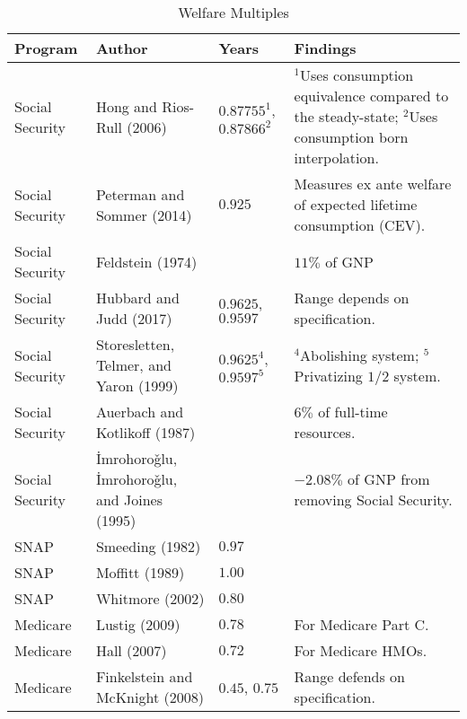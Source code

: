 \documentclass{article}
\begin{document}
\begin{sidewaystable}
\caption{Welfare Multiples}
\centering
\label{Measures of In-kind Program Welfare Effects}
\begin{tabularx}{\textwidth}{l X l X}
\toprule
Program		&		
Author		&		
Years		&
Findings	\\
\midrule
Social Security	&
Hong and Rios-Rull (2006)	&
$0.87755^1$, $0.87866^2$ &
$^1$Uses consumption equivalence compared to the steady-state;
$^2$Uses consumption born interpolation. \\

Social Security	&
Peterman and Sommer (2014)		&
$0.925$ &
Measures ex ante welfare of expected lifetime consumption (CEV). \\

Social Security	&
Feldstein (1974)		&
&
$11\%$ of GNP \\

Social Security	&
Hubbard and Judd (2017)		&
$0.9625$, $0.9597$ &
Range depends on specification. \\ 

Social Security	&
Storesletten, Telmer, and Yaron (1999)		&
$0.9625^4$, $0.9597^5$ &
$^4$Abolishing system; $^5$Privatizing $1/2$ system. \\

Social Security	&
Auerbach and Kotlikoff (1987)		&
&
$6\%$ of full-time resources. \\

Social Security	&
İmrohoroǧlu, İmrohoroǧlu, and Joines (1995)		&
&
$-2.08\%$ of GNP from removing Social Security. \\

SNAP				&
Smeeding (1982)		&
$0.97$ 				&
\\

SNAP				&
Moffitt (1989)		&
$1.00$ 				&
\\

SNAP				&
Whitmore (2002)		&
$0.80$ 				&
\\

Medicare			&
Lustig (2009)		&
$0.78$ 				&
For Medicare Part C. \\

Medicare			&
Hall (2007)		&
$0.72$ 				&
For Medicare HMOs. \\

Medicare			&
Finkelstein and McKnight (2008)		&
$0.45$, $0.75$ 				&
Range defends on specification. \\


\end{tabularx}
\end{sidewaystable}
\end{document}
